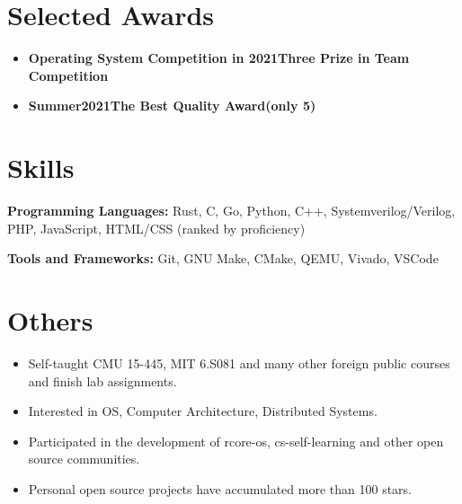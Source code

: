 \documentclass{resume}
\begin{document}


\section{Selected Awards}
\begin{itemize}
  \item \textbf{Operating System Competition in 2021}\quad \textbf{Three Prize in Team Competition}
  \item \textbf{Summer2021}\quad \textbf{The Best Quality Award(only 5)}
\end{itemize}



\section{Skills}
\textbf{Programming Languages:} \small Rust, C, Go, Python, C++, Systemverilog/Verilog, PHP, JavaScript, HTML/CSS (ranked by proficiency)

\textbf{Tools and Frameworks:} \small Git, GNU Make, CMake, QEMU, Vivado, VSCode

\section{Others}
\begin{itemize}
  \item Self-taught CMU 15-445, MIT 6.S081 and many other foreign public courses and finish lab assignments.
  \item Interested in OS, Computer Architecture, Distributed Systems.
  \item Participated in the development of rcore-os, cs-self-learning and other open source communities.
  \item Personal open source projects have accumulated more than 100 stars.
\end{itemize}
\end{document}
